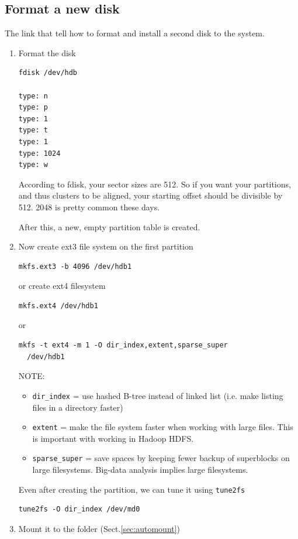 \subsection{Format a new disk}
\label{sec:format_disk}

The link that tell how to format and install a second disk to the system.
\begin{enumerate}
  \item Format the disk
\begin{verbatim}
fdisk /dev/hdb

type: n
type: p 
type: 1
type: t
type: 1
type: 1024
type: w
\end{verbatim}
According to fdisk, your sector sizes are 512. So if you want your partitions,
and thus clusters to be aligned, your starting offset should be divisible by
512. 2048 is pretty common these days. 



After this, a new, empty partition table is created. 


  \item Now create ext3 file system on the first partition
\begin{verbatim}
mkfs.ext3 -b 4096 /dev/hdb1
\end{verbatim}

or create ext4 filesystem
\begin{verbatim}
mkfs.ext4 /dev/hdb1
\end{verbatim}
or
\begin{verbatim}
mkfs -t ext4 -m 1 -O dir_index,extent,sparse_super
  /dev/hdb1
\end{verbatim}
NOTE:
\begin{itemize}
  \item \verb!dir_index! = use hashed B-tree instead of linked list (i.e. make
  listing files in a directory faster)
  
  \item \verb!extent! = make the file system faster when working with large
  files. This is important with working in Hadoop HDFS.
  
  \item \verb!sparse_super! = save spaces by keeping fewer backup of
  superblocks on large filesystems. Big-data analysis implies large filesystems.
\end{itemize}

Even after creating the partition, we can tune it using \verb!tune2fs!
\begin{verbatim}
tune2fs -O dir_index /dev/md0
\end{verbatim}

  \item Mount it to the folder (Sect.\ref{sec:automount})  
   
\end{enumerate}

